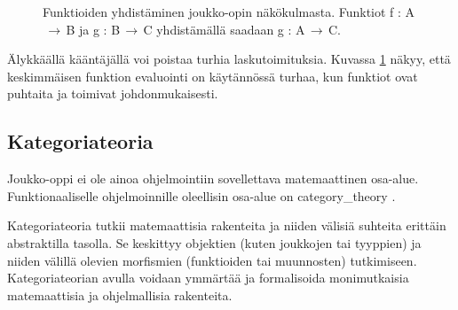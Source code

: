\begin{figure}[htbp]
    \vspace{10pt}
    \caption{Funktioiden yhdistäminen joukko-opin näkökulmasta. Funktiot f : A$\,\to\,$B ja g : B$\,\to\,$C yhdistämällä saadaan g : A$\,\to\,$C.}
    \label{fig:function_composition_in_sets}
\end{figure}

Älykkäällä kääntäjällä voi poistaa turhia laskutoimituksia. Kuvassa \ref{fig:function_composition_in_sets} näkyy, että keskimmäisen funktion evaluointi on käytännössä turhaa, kun funktiot ovat puhtaita ja toimivat johdonmukaisesti.



\subsection{Kategoriateoria}


Joukko-oppi ei ole ainoa ohjelmointiin sovellettava matemaattinen osa-alue. Funktionaaliselle ohjelmoinnille oleellisin osa-alue on \gls{category_theory} \cite{bartosz_category_for_progamers,promises-spec-94}.

Kategoriateoria tutkii matemaattisia rakenteita ja niiden välisiä suhteita erittäin abstraktilla tasolla. Se keskittyy objektien (kuten joukkojen tai tyyppien) ja niiden välillä olevien morfismien (funktioiden tai muunnosten) tutkimiseen. Kategoriateorian avulla voidaan ymmärtää ja formalisoida monimutkaisia matemaattisia ja ohjelmallisia rakenteita. \citep{bartosz_category_for_progamers,promises-spec-94,category_theory}

